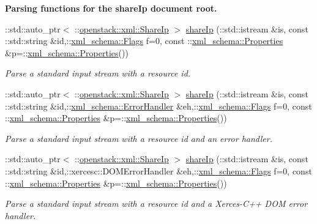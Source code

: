 \begin{Indent}{\bf Parsing functions for the shareIp document root.}
\begin{DoxyCompactItemize}
::std::auto\_\-ptr$<$ ::\hyperlink{classopenstack_1_1xml_1_1ShareIp}{openstack::xml::ShareIp} $>$ \hyperlink{namespaceopenstack_1_1xml_a1f5ae6e57f6caa206e1461e3cb677722}{shareIp} (::std::istream \&is, const ::std::string \&id,::\hyperlink{namespacexml__schema_affb4c227cbd9aa7453dd1dc5a1401943}{xml\_\-schema::Flags} f=0, const ::\hyperlink{namespacexml__schema_ad27ce19a7ee1d3b1064092648898f64c}{xml\_\-schema::Properties} \&p=::\hyperlink{namespacexml__schema_ad27ce19a7ee1d3b1064092648898f64c}{xml\_\-schema::Properties}())
\begin{DoxyCompactList}\small\item\em Parse a standard input stream with a resource id. \item\end{DoxyCompactList}\item 
::std::auto\_\-ptr$<$ ::\hyperlink{classopenstack_1_1xml_1_1ShareIp}{openstack::xml::ShareIp} $>$ \hyperlink{namespaceopenstack_1_1xml_ac312485df46f12e3399ef05ac4b81853}{shareIp} (::std::istream \&is, const ::std::string \&id,::\hyperlink{namespacexml__schema_ab1c9361bfd3b404eaabf0c31eded79dc}{xml\_\-schema::ErrorHandler} \&eh,::\hyperlink{namespacexml__schema_affb4c227cbd9aa7453dd1dc5a1401943}{xml\_\-schema::Flags} f=0, const ::\hyperlink{namespacexml__schema_ad27ce19a7ee1d3b1064092648898f64c}{xml\_\-schema::Properties} \&p=::\hyperlink{namespacexml__schema_ad27ce19a7ee1d3b1064092648898f64c}{xml\_\-schema::Properties}())
\begin{DoxyCompactList}\small\item\em Parse a standard input stream with a resource id and an error handler. \item\end{DoxyCompactList}\item 
::std::auto\_\-ptr$<$ ::\hyperlink{classopenstack_1_1xml_1_1ShareIp}{openstack::xml::ShareIp} $>$ \hyperlink{namespaceopenstack_1_1xml_a2414ab5eb2c30d7db46b10e1b6c76a06}{shareIp} (::std::istream \&is, const ::std::string \&id,::xercesc::DOMErrorHandler \&eh,::\hyperlink{namespacexml__schema_affb4c227cbd9aa7453dd1dc5a1401943}{xml\_\-schema::Flags} f=0, const ::\hyperlink{namespacexml__schema_ad27ce19a7ee1d3b1064092648898f64c}{xml\_\-schema::Properties} \&p=::\hyperlink{namespacexml__schema_ad27ce19a7ee1d3b1064092648898f64c}{xml\_\-schema::Properties}())
\begin{DoxyCompactList}\small\item\em Parse a standard input stream with a resource id and a Xerces-\/C++ DOM error handler. \item\end{DoxyCompactList}\item 

\end{DoxyCompactItemize}
\end{Indent}
